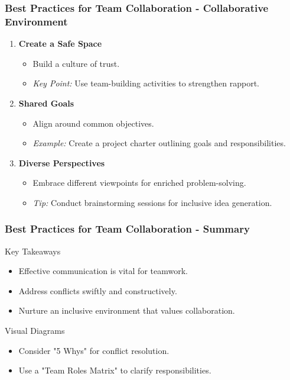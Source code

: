 \documentclass[aspectratio=169]{beamer}
\begin{document}
\begin{frame}[fragile]
    \frametitle{Best Practices for Team Collaboration - Collaborative Environment}
    \begin{enumerate}
        \item \textbf{Create a Safe Space} 
        \begin{itemize}
            \item Build a culture of trust.
            \item \textit{Key Point:} Use team-building activities to strengthen rapport.
        \end{itemize}
        
        \item \textbf{Shared Goals} 
        \begin{itemize}
            \item Align around common objectives.
            \item \textit{Example:} Create a project charter outlining goals and responsibilities.
        \end{itemize}
        
        \item \textbf{Diverse Perspectives} 
        \begin{itemize}
            \item Embrace different viewpoints for enriched problem-solving.
            \item \textit{Tip:} Conduct brainstorming sessions for inclusive idea generation.
        \end{itemize}
    \end{enumerate}
\end{frame}

\begin{frame}[fragile]
    \frametitle{Best Practices for Team Collaboration - Summary}
    \begin{block}{Key Takeaways}
        \begin{itemize}
            \item Effective communication is vital for teamwork.
            \item Address conflicts swiftly and constructively.
            \item Nurture an inclusive environment that values collaboration.
        \end{itemize}
    \end{block}
    
    \begin{block}{Visual Diagrams}
        \begin{itemize}
            \item Consider "5 Whys" for conflict resolution.
            \item Use a "Team Roles Matrix" to clarify responsibilities.
        \end{itemize}
    \end{block}
\end{frame}
\end{document}

